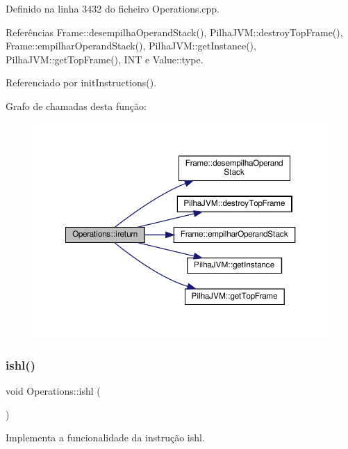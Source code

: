 Definido na linha 3432 do ficheiro Operations.\+cpp.



Referências Frame\+::desempilha\+Operand\+Stack(), Pilha\+J\+V\+M\+::destroy\+Top\+Frame(), Frame\+::empilhar\+Operand\+Stack(), Pilha\+J\+V\+M\+::get\+Instance(), Pilha\+J\+V\+M\+::get\+Top\+Frame(), I\+NT e Value\+::type.



Referenciado por init\+Instructions().

Grafo de chamadas desta função\+:\nopagebreak
\begin{figure}[H]
\begin{center}
\leavevmode
\includegraphics[width=350pt]{classOperations_a4be12fb7c8eeee8a2f6489ec27a46dce_cgraph}
\end{center}
\end{figure}
\mbox{\label{classOperations_a3139bbe41519fb4761ecd7e2a8ddb994}} 
\subsubsection{\texorpdfstring{ishl()}{ishl()}}
{\footnotesize\ttfamily void Operations\+::ishl (\begin{DoxyParamCaption}{ }\end{DoxyParamCaption})\hspace{0.3cm}{\ttfamily [private]}}



Implementa a funcionalidade da instrução ishl. 



